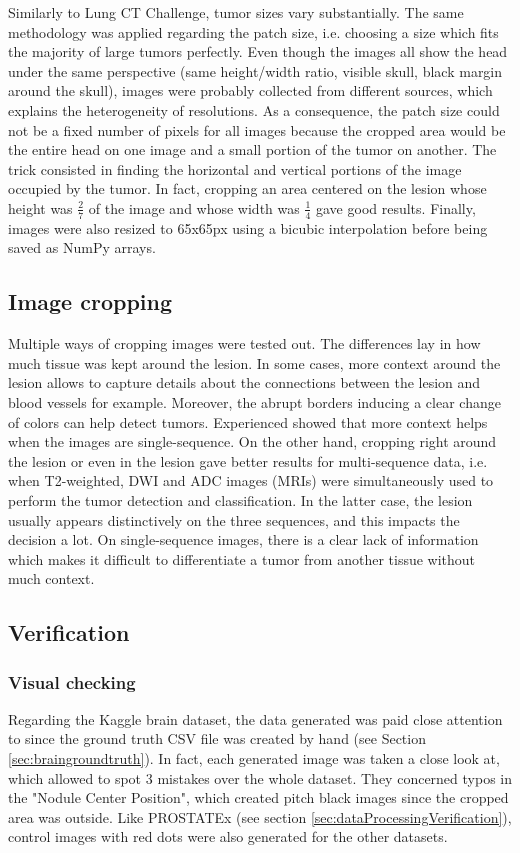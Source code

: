 Similarly to Lung CT Challenge, tumor sizes vary substantially. The same methodology was applied regarding the patch size, i.e. choosing a size which fits the majority of large tumors perfectly. Even though the images all show the head under the same perspective (same height/width ratio, visible skull, black margin around the skull), images were probably collected from different sources, which explains the heterogeneity of resolutions. As a consequence, the patch size could not be a fixed number of pixels for all images because the cropped area would be the entire head on one image and a small portion of the tumor on another. The trick consisted in finding the horizontal and vertical portions of the image occupied by the tumor. In fact, cropping an area centered on the lesion whose height was $\frac{2}{7}$ of the image and whose width was $\frac{1}{4}$ gave good results. Finally, images were also resized to 65x65px using a bicubic interpolation before being saved as NumPy arrays. 


\subsection{Image cropping}
\setlength{\marginparwidth}{3cm}\leavevmode {}Multiple ways of cropping images were tested out. The differences lay in how much tissue was kept around the lesion. In some cases, more context around the lesion allows to capture details about the connections between the lesion and blood vessels for example. Moreover, the abrupt borders inducing a clear change of colors can help detect tumors. Experienced showed that more context helps when the images are single-sequence. On the other hand, cropping right around the lesion or even in the lesion gave better results for multi-sequence data, i.e. when T2-weighted, DWI and ADC images (MRIs) were simultaneously used to perform the tumor detection and classification. In the latter case, the lesion usually appears distinctively on the three sequences, and this impacts the decision a lot. On single-sequence images, there is a clear lack of information which makes it difficult to differentiate a tumor from another tissue without much context. 


\subsection{Verification}
\subsubsection{Visual checking}
\setlength{\marginparwidth}{3cm}\leavevmode {}Regarding the Kaggle brain dataset, the data generated was paid close attention to since the ground truth CSV file was created by hand (see Section \ref{sec:braingroundtruth}). In fact, each generated image was taken a close look at, which allowed to spot 3 mistakes over the whole dataset. They concerned typos in the "Nodule Center Position", which created pitch black images since the cropped area was outside.
Like PROSTATEx (see section \ref{sec:dataProcessingVerification}), control images with red dots were also generated for the other datasets. 


